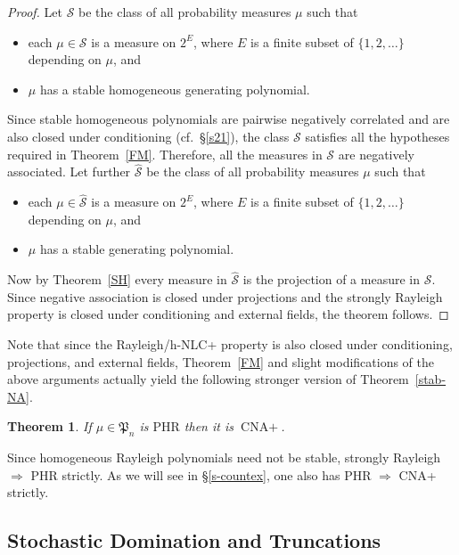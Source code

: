 \documentclass[10pt,reqno]{amsart}
\theoremstyle{plain}
\newtheorem{theorem}{Theorem}[section]
\theoremstyle{definition}
\theoremstyle{remark}
\newcommand{\PHR}{\text{PHR}}
\newcommand{\CNA}{\text{CNA}}
\newcommand{\fP}{\mathfrak{P}}
\begin{document}
\begin{proof}
Let $\mathcal{S}$ be the class of all probability measures $\mu$ such that 
\begin{itemize} 
\item each $\mu \in \mathcal{S}$ is a measure on $2^{E}$, where $E$ is a 
finite subset of $\{1,2,\ldots\}$ depending on $\mu$, and 
\item $\mu$ has a stable homogeneous generating polynomial.  
\end{itemize}
Since stable homogeneous polynomials are pairwise negatively correlated and
are also closed under conditioning (cf.~\S \ref{s21}), the class 
$\mathcal{S}$ satisfies all the hypotheses required in Theorem~\ref{FM}.
Therefore, all the measures in $\mathcal{S}$ are negatively associated. Let 
further $\widehat{\mathcal{S}}$ 
be the class of all probability measures $\mu$ such that 
\begin{itemize} 
\item each $\mu \in \widehat{\mathcal{S}}$ is a measure on $2^{E}$, where 
$E$ is a 
finite subset of $\{1,2,\ldots\}$ depending on $\mu$, and 
\item $\mu$ has a stable generating polynomial.  
\end{itemize}
Now by Theorem~\ref{SH} every measure in $\widehat{\mathcal{S}}$ is the 
projection of a measure in 
$\mathcal{S}$. Since negative association is closed under projections and 
the strongly Rayleigh property is closed under conditioning and external 
fields, the theorem follows.
\end{proof}

Note that since the Rayleigh/h-NLC+ property is also closed under conditioning,
projections, and external fields, Theorem~\ref{FM} and slight modifications of
the above arguments actually yield the following stronger version of 
Theorem~\ref{stab-NA}.

\begin{theorem}\label{PHR-NA}
If $\mu\in \fP_n$ is $\PHR$ then it is $\CNA+$. 
\end{theorem}

Since homogeneous Rayleigh polynomials need not be stable, 
strongly Rayleigh $\Rightarrow$ PHR strictly. As we will see in 
\S \ref{s-countex}, one also has PHR $\Rightarrow$ CNA+ strictly.

\subsection{Stochastic Domination and Truncations}\label{ss-trunc}
\end{document}
